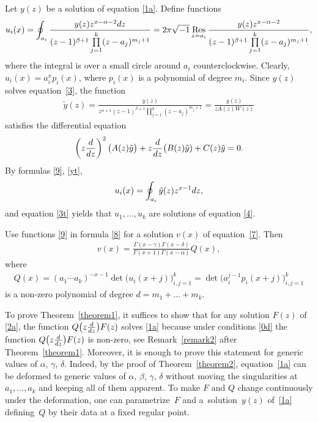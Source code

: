 \documentclass[11pt]{article}
\numberwithin{equation}{section}
\def\lc{,\allowbreak\ldots,\allowbreak}
\def\Res{\mathop{\mathrm{Res}}\limits}
\def\yt{\tilde y}
\begin{document}
Let $y(z)$ be a solution of equation \eqref{1a}. Define functions
\begin{gather}
 u_i(x) = \oint_{a_i}\frac{y(z) z^{x-\alpha-2} {\rm d}z}
{(z-1)^{\beta+1}\prod\limits_{j=1}^k(z-a_j)^{m_j+1}}
= 2\pi\sqrt{-1} \Res_{z=a_i} \frac{y(z) z^{x-\alpha-2}}
{(z-1)^{\beta+1}\prod\limits_{j=1}^k(z-a_j)^{m_j+1}},\label{9}
\end{gather}
where the integral is over a small circle around $a_i$ counterclockwise. Clearly, $u_i(x)=a_i^xp_i(x)$, where $p_i(x)$ is a polynomial of degree $m_i$. Since $y(z)$ solves equation~\eqref{3}, the function
\begin{gather}\label{yt}
\yt(z) =
\frac{y(z)}{z^{\alpha+1}(z-1)^{\beta+1}\prod\limits_{j=1}^k(z-a_j)^{m_j+1}} =\frac{y(z)}{zA(z)W(z)}
\end{gather}
satisfies the differential equation
\begin{gather}
\left(z\frac{{\rm d}}{{\rm d}z}\right)^{ 2} \bigl( A(z) \yt\bigr)+ z\frac{{\rm d}}{{\rm d}z}\bigl(B(z) \yt)+C(z) \yt = 0.\label{3t}
\end{gather}
By formulas \eqref{9}, \eqref{yt},{\samepage
\begin{gather*}%
u_i(x)=\oint_{a_i}\yt(z) z^{x-1} {\rm d}z,
\end{gather*}
and equation \eqref{3t} yields that $u_1\lc u_k$ are solutions of equation \eqref{4}.}

Use functions \eqref{9} in formula \eqref{8} for a solution $v(x)$ of equation~\eqref{7}. Then
\begin{gather}
v(x) = \frac{\Gamma(x-\gamma) \Gamma(x-\delta)}{\Gamma(x+1) \Gamma(x-\alpha)} Q(x),\label{10}
\end{gather}
where
\begin{gather*}%
Q(x) = (a_1\cdots a_k)^{-x-1}\det\bigl(u_i(x+j)\bigr)_{i,j=1}^k=
 \det\bigl(a_i^{j-1}p_i(x+j)\bigr)_{i,j=1}^k
\end{gather*}
is a non-zero polynomial of degree $d=m_1+\dots+m_k$.

To prove Theorem~\ref{theorem1}, it suffices to show that for any solution $F(z)$ of \eqref{2a}, the function $Q\big(z\frac{{\rm d}}{{\rm d}z}\big)F(z)$ solves \eqref{1a} because under conditions \eqref{0d} the function $Q\big(z\frac{{\rm d}}{{\rm d}z}\big)F(z)$ is non-zero, see Remark~\ref{remark2} after Theorem~\ref{theorem1}. Moreover, it is enough to prove this statement for generic values of $\alpha$, $\gamma$, $\delta$. Indeed, by the proof of Theorem~\ref{theorem2}, equation~\eqref{1a} can be deformed to generic values of $\alpha$, $\beta$, $\gamma$, $\delta$ without moving the singularities at $a_1\lc a_k$ and keeping all of them apparent. To make $F$ and $Q$ change continuously under the deformation, one can parametrize~$F$ and a~solution~$y(z)$ of~\eqref{1a} defining~$Q$ by their data at a fixed regular point.
\end{document}
